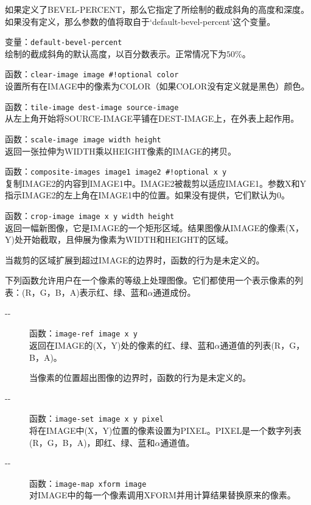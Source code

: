 \documentclass{book}
\begin{document}
\begin{CJK*}{UTF8}{gbsn}
\begin{description}
如果定义了BEVEL-PERCENT，那么它指定了所绘制的截成斜角的高度和深度。如果没有定义，那么参数的值将取自于`default-bevel-percent'这个变量。
\item[-{}-] 变量：\verb|default-bevel-percent|\\
绘制的截成斜角的默认高度，以百分数表示。正常情况下为$50\%$。
\item[-{}-] 函数：\verb|clear-image image #!optional color|\\
设置所有在IMAGE中的像素为COLOR（如果COLOR没有定义就是黑色）颜色。
\item[-{}-] 函数：\verb|tile-image dest-image source-image|\\
从左上角开始将SOURCE-IMAGE平铺在DEST-IMAGE上，在外表上起作用。
\item[-{}-] 函数：\verb|scale-image image width height|\\
返回一张拉伸为WIDTH乘以HEIGHT像素的IMAGE的拷贝。
\item[-{}-] 函数：\verb|composite-images image1 image2 #!optional x y|\\
复制IMAGE2的内容到IMAGE1中。IMAGE2被裁剪以适应IMAGE1。参数X和Y指示IMAGE2的左上角在IMAGE1中的位置。如果没有提供，它们默认为0。
\item[-{}-] 函数：\verb|crop-image image x y width height|\\
返回一幅新图像，它是IMAGE的一个矩形区域。结果图像从IMAGE的像素(X，Y)处开始截取，且伸展为像素为WIDTH和HEIGHT的区域。

当裁剪的区域扩展到超过IMAGE的边界时，函数的行为是未定义的。
\end{description}

下列函数允许用户在一个像素的等级上处理图像。它们都使用一个表示像素的列表：(R，G，B，A)表示红、绿、蓝和$\alpha $通道成份。
\begin{description}
\item[-{}-] 函数：\verb|image-ref image x y|\\
返回在IMAGE的(X，Y)处的像素的红、绿、蓝和$\alpha $通道值的列表(R，G，B，A)。

当像素的位置超出图像的边界时，函数的行为是未定义的。
\item[-{}-] 函数：\verb|image-set image x y pixel|\\
将在IMAGE中(X，Y)位置的像素设置为PIXEL。PIXEL是一个数字列表(R，G，B，A)，即红、绿、蓝和$\alpha $通道值。
\item[-{}-] 函数：\verb|image-map xform image|\\
对IMAGE中的每一个像素调用XFORM并用计算结果替换原来的像素。


\end{description}
\end{CJK*}
\end{document}

